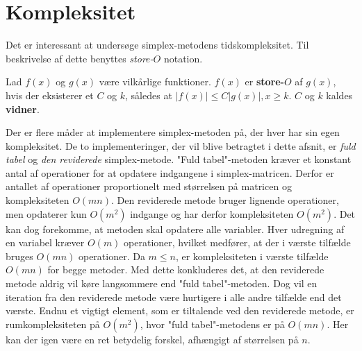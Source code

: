 \section{Kompleksitet}
Det er interessant at undersøge simplex-metodens tidskompleksitet.
Til beskrivelse af dette benyttes \textit{store-$O$} notation.
%
\begin{defn}{}{}
Lad $f(x)$ og $g(x)$ være vilkårlige funktioner. $f(x)$ er \textbf{store-$O$} af $g(x)$, hvis der eksisterer et $C$ og $k$, således at $|f(x)| \leq C|g(x)|, x \geq k$. $C$ og $k$ kaldes \textbf{vidner}.
\end{defn}\noindent
%
Der er flere måder at implementere simplex-metoden på, der hver har sin egen kompleksitet.
De to implementeringer, der vil blive betragtet i dette afsnit, er \textit{fuld tabel} og \textit{den reviderede} simplex-metode.
%
"Fuld tabel"-metoden kræver et konstant antal af operationer for at opdatere indgangene i simplex-matricen.
Derfor er antallet af operationer proportionelt med størrelsen på matricen og kompleksiteten $O(mn)$.
Den reviderede metode bruger lignende operationer, men opdaterer kun $O(m^2)$ indgange og har derfor kompleksiteten $O(m^2)$.
Det kan dog forekomme, at metoden skal opdatere alle variabler.
Hver udregning af en variabel kræver $O(m)$ operationer, hvilket medfører, at der i værste tilfælde bruges $O(mn)$ operationer.
Da $m \leq n$, er kompleksiteten i værste tilfælde $O(mn)$ for begge metoder.
Med dette konkluderes det, at den reviderede metode aldrig vil køre langsommere end "fuld tabel"-metoden.
Dog vil en iteration fra den reviderede metode være hurtigere i alle andre tilfælde end det værste.
Endnu et vigtigt element, som er tiltalende ved den reviderede metode, er rumkompleksiteten på $O(m^2)$, hvor "fuld tabel"-metodens er på $O(mn)$.
Her kan der igen være en ret betydelig forskel, afhængigt af størrelsen på $n$.